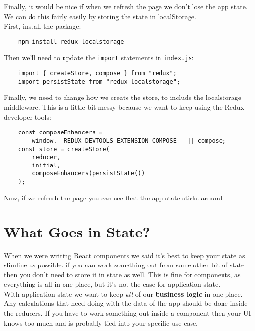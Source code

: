 Finally, it would be nice if when we refresh the page we don't lose the app state. We can do this fairly easily by storing the state in \href{https://developer.mozilla.org/en-US/docs/Web/API/Window/localStorage}{localStorage}.
\\

First, install the package:

\begin{verbatim}
    npm install redux-localstorage
\end{verbatim}

Then we'll need to update the \texttt{import} statements in \texttt{index.js}:

\begin{verbatim}
    import { createStore, compose } from "redux";
    import persistState from "redux-localstorage";
\end{verbatim}

Finally, we need to change how we create the store, to include the localstorage middleware. This is a little bit messy because we want to keep using the Redux developer tools:

\begin{verbatim}
    const composeEnhancers =
        window.__REDUX_DEVTOOLS_EXTENSION_COMPOSE__ || compose;
    const store = createStore(
        reducer,
        initial,
        composeEnhancers(persistState())
    );
\end{verbatim}

Now, if we refresh the page you can see that the app state sticks around.


\section{What Goes in State?}

When we were writing React components we said it's best to keep your state as slimline as possible: if you can work something out from some other bit of state then you don't need to store it in state as well. This is fine for components, as everything is all in one place, but it's not the case for application state.
\\

With application state we want to keep \textit{all} of our \textbf{business logic} in one place. Any calculations that need doing with the data of the app should be done inside the reducers. If you have to work something out inside a component then your UI knows too much and is probably tied into your specific use case.
\\

